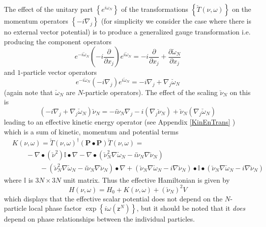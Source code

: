 \documentclass[aps,preprint]{revtex4}%
\begin{document}
The effect of the unitary part $\left\{  e^{i\omega_{N}}\right\}  $ of the
transformations $\left\{  \breve{T}\left(  \nu,\omega\right)  \right\}  $ on
the momentum operators $\left\{  -i\nabla_{j}\right\}  $ (for simplicity we
consider the case where there is no external vector potential) is to produce a
generalized gauge transformation i.e. producing the component operators
\begin{equation}
e^{-i\breve{\omega}_{N}}\left(  -i\frac{\partial}{\partial x_{j}}\right)
e^{i\breve{\omega}_{N}}=-i\frac{\partial}{\partial x_{j}}+\frac{\partial
\breve{\omega}_{N}}{\partial x_{j}}%
\end{equation}
and $1$-particle vector operators
\begin{equation}
e^{-i\breve{\omega}_{N}}\left(  -i\nabla_{j}\right)  e^{i\breve{\omega}_{N}%
}=-i\nabla_{j}+\nabla_{j}\breve{\omega}_{N}%
\end{equation}
(again note that $\breve{\omega}_{N}$ are $N$-particle operators). The effect
of the scaling $\breve{\nu}_{N}$ on this is
\begin{equation}
\left(  -i\nabla_{j}+\nabla_{j}\breve{\omega}_{N}\right)  \breve{\nu}%
_{N}=-i\breve{\nu}_{N}\nabla_{j}-i\left(  \nabla_{j}\breve{\nu}_{N}\right)
+\breve{\nu}_{N}\left(  \nabla_{j}\breve{\omega}_{N}\right)
\end{equation}
leading to an effective kinetic energy operator (see Appendix \ref{KinEnTrans}%
) which is a sum of kinetic, momentum and potential terms
\begin{align}
&  K\left(  \nu,\omega\right)  =\breve{T}\left(  \nu,\omega\right)  ^{\dagger
}\left(  \mathbf{P\bullet P}\right)  \breve{T}\left(  \nu,\omega\right)
=\nonumber\\
&  \qquad-\nabla\bullet\left(  \breve{\nu}^{2}\right)  \mathbb{I}\bullet
\nabla-\nabla\bullet\left(  \breve{\nu}_{N}^{2}\nabla\breve{\omega}%
_{N}-i\breve{\nu}_{N}\nabla\breve{\nu}_{N}\right) \nonumber\\
&  \qquad\qquad-\left(  \breve{\nu}_{N}^{2}\nabla\breve{\omega}_{N}%
-i\breve{\nu}_{N}\nabla\breve{\nu}_{N}\right)  \bullet\nabla+\left(
\breve{\nu}_{N}\nabla\breve{\omega}_{N}-i\nabla\breve{\nu}_{N}\right)
\bullet\mathbb{I}\bullet\left(  \breve{\nu}_{N}\nabla\breve{\omega}%
_{N}-i\nabla\breve{\nu}_{N}\right)  \label{effkin}%
\end{align}
where $\mathbb{I}$ is $3N\times3N$ unit matrix. Thus the effective Hamiltonian
is given by%
\begin{equation}
H\left(  \nu,\omega\right)  =H_{0}+K\left(  \nu,\omega\right)  +\left(
\breve{\nu}_{N}\right)  ^{2}V \label{effham2}%
\end{equation}
which displays that the effective scalar potential does not depend on the
$N$-particle local phase factor $\exp\left\{  i\omega\left(  \mathsf{z}%
^{N}\right)  \right\}  $, but it should be noted that it \emph{does }depend on
phase relationships between the individual particles.
\end{document}
